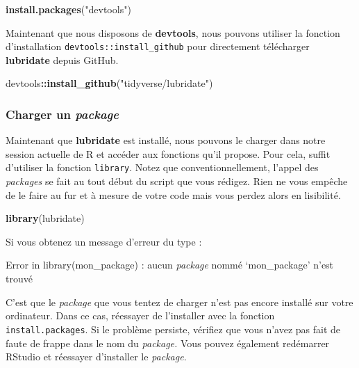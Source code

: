 \documentclass[
  11pt,
  french,
]{book}
\makeatletter
\newenvironment{Shaded}{\begin{snugshade}}{\end{snugshade}}
\newcommand{\KeywordTok}[1]{\textcolor[rgb]{0.13,0.29,0.53}{\textbf{#1}}}
\newcommand{\NormalTok}[1]{#1}
\newcommand{\OperatorTok}[1]{\textcolor[rgb]{0.81,0.36,0.00}{\textbf{#1}}}
\newcommand{\StringTok}[1]{\textcolor[rgb]{0.31,0.60,0.02}{#1}}
\newenvironment{kframe}{%
\medskip{}
\setlength{\fboxsep}{.8em}
 \def\at@end@of@kframe{}%
 \ifinner\ifhmode%
  \def\at@end@of@kframe{\end{minipage}}%
  \begin{minipage}{\columnwidth}%
 \fi\fi%
 \def\FrameCommand##1{\hskip\@totalleftmargin \hskip-\fboxsep
 \colorbox{shadecolor}{##1}\hskip-\fboxsep
     \hskip-\linewidth \hskip-\@totalleftmargin \hskip\columnwidth}%
 \MakeFramed {\advance\hsize-\width
   \@totalleftmargin\z@ \linewidth\hsize
   \@setminipage}}%
 {\par\unskip\endMakeFramed%
 \at@end@of@kframe}
\renewenvironment{Shaded}{\begin{kframe}}{\end{kframe}}
\makeatother
\begin{document}
\begin{Shaded}
\begin{Highlighting}[]
\KeywordTok{install.packages}\NormalTok{(}\StringTok{"devtools"}\NormalTok{)}
\end{Highlighting}
\end{Shaded}

Maintenant que nous disposons de \textbf{devtools}, nous pouvons utiliser la fonction d'installation \texttt{devtools::install\_github} pour directement télécharger \textbf{lubridate} depuis GitHub.

\begin{Shaded}
\begin{Highlighting}[]
\NormalTok{devtools}\OperatorTok{::}\KeywordTok{install_github}\NormalTok{(}\StringTok{"tidyverse/lubridate"}\NormalTok{)}
\end{Highlighting}
\end{Shaded}

\hypertarget{sect01233}{%
\subsubsection{\texorpdfstring{Charger un \emph{package}}{Charger un package}}\label{sect01233}}

Maintenant que \textbf{lubridate} est installé, nous pouvons le charger dans notre session actuelle de R et accéder aux fonctions qu'il propose. Pour cela, suffit d'utiliser la fonction \texttt{library}. Notez que conventionnellement, l'appel des \emph{packages} se fait au tout début du script que vous rédigez. Rien ne vous empêche de le faire au fur et à mesure de votre code mais vous perdez alors en lisibilité.

\begin{Shaded}
\begin{Highlighting}[]
\KeywordTok{library}\NormalTok{(lubridate)}
\end{Highlighting}
\end{Shaded}

Si vous obtenez un message d'erreur du type :

{Error in library(mon\_package) : aucun \emph{package} nommé `mon\_package' n'est trouvé}

C'est que le \emph{package} que vous tentez de charger n'est pas encore installé sur votre ordinateur. Dans ce cas, réessayer de l'installer avec la fonction \texttt{install.packages}. Si le problème persiste, vérifiez que vous n'avez pas fait de faute de frappe dans le nom du \emph{package.} Vous pouvez également redémarrer RStudio et réessayer d'installer le \emph{package}.
\end{document}
